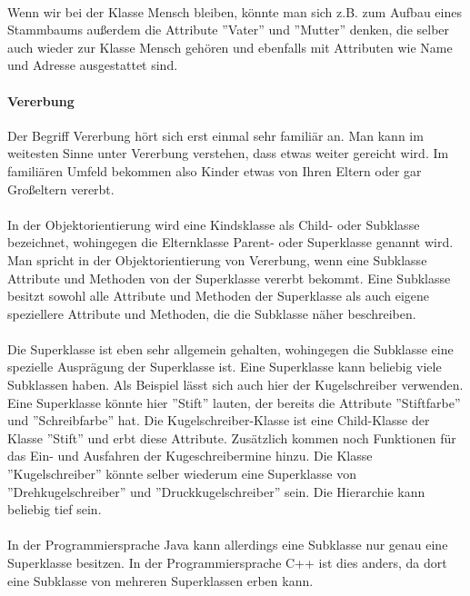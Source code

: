 \\
Wenn wir bei der Klasse Mensch bleiben, könnte man sich z.B. zum Aufbau eines Stammbaums außerdem die Attribute ''Vater'' und ''Mutter'' denken, die selber auch wieder zur Klasse Mensch gehören und ebenfalls mit Attributen wie Name und Adresse ausgestattet sind.
 
 \paragraph{Vererbung}
Der Begriff Vererbung hört sich erst einmal sehr familiär an. Man kann im weitesten Sinne unter Vererbung verstehen, dass etwas weiter gereicht wird. Im familiären Umfeld bekommen also Kinder etwas von Ihren Eltern oder gar Großeltern vererbt.\\
\\
In der Objektorientierung wird eine Kindsklasse als Child- oder Subklasse bezeichnet, wohingegen die Elternklasse Parent- oder Superklasse genannt wird. Man spricht in der Objektorientierung von Vererbung, wenn eine Subklasse Attribute und Methoden von der Superklasse vererbt bekommt. Eine Subklasse besitzt sowohl alle Attribute und Methoden der Superklasse als auch eigene speziellere Attribute und Methoden, die die Subklasse näher beschreiben.\\
\\
Die Superklasse ist eben sehr allgemein gehalten, wohingegen die Subklasse eine spezielle Ausprägung der Superklasse ist. Eine Superklasse kann beliebig viele Subklassen haben. Als Beispiel lässt sich auch hier der Kugelschreiber verwenden. Eine Superklasse könnte hier ''Stift'' lauten, der bereits die Attribute ''Stiftfarbe'' und ''Schreibfarbe'' hat. Die Kugelschreiber-Klasse ist eine Child-Klasse der Klasse ''Stift'' und erbt diese Attribute. Zusätzlich kommen noch Funktionen für das Ein- und Ausfahren der Kugeschreibermine hinzu. Die Klasse ''Kugelschreiber'' könnte selber wiederum eine Superklasse von ''Drehkugelschreiber'' und ''Druckkugelschreiber'' sein. Die Hierarchie kann beliebig tief sein.\\
\\
In der Programmiersprache Java kann allerdings eine Subklasse nur genau eine Superklasse besitzen. In der Programmiersprache C++ ist dies anders, da dort eine Subklasse von mehreren Superklassen erben kann.\\
\\
